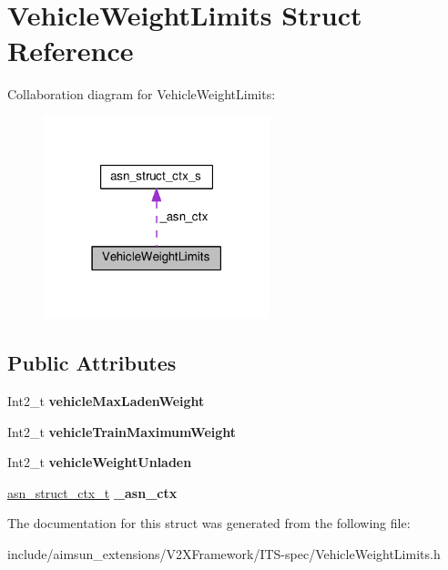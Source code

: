 \hypertarget{structVehicleWeightLimits}{}\section{Vehicle\+Weight\+Limits Struct Reference}
\label{structVehicleWeightLimits}


Collaboration diagram for Vehicle\+Weight\+Limits\+:\nopagebreak
\begin{figure}[H]
\begin{center}
\leavevmode
\includegraphics[width=186pt]{structVehicleWeightLimits__coll__graph}
\end{center}
\end{figure}
\subsection*{Public Attributes}
\begin{DoxyCompactItemize}
\item 
Int2\+\_\+t {\bfseries vehicle\+Max\+Laden\+Weight}\hypertarget{structVehicleWeightLimits_ac32d9e25c41ef6546b2a548384ee5153}{}\label{structVehicleWeightLimits_ac32d9e25c41ef6546b2a548384ee5153}

\item 
Int2\+\_\+t {\bfseries vehicle\+Train\+Maximum\+Weight}\hypertarget{structVehicleWeightLimits_a3f83f448ee86cdf19be08326a472f71c}{}\label{structVehicleWeightLimits_a3f83f448ee86cdf19be08326a472f71c}

\item 
Int2\+\_\+t {\bfseries vehicle\+Weight\+Unladen}\hypertarget{structVehicleWeightLimits_a3649cfe01f681317965b1d7de6223d08}{}\label{structVehicleWeightLimits_a3649cfe01f681317965b1d7de6223d08}

\item 
\hyperlink{structasn__struct__ctx__s}{asn\+\_\+struct\+\_\+ctx\+\_\+t} {\bfseries \+\_\+asn\+\_\+ctx}\hypertarget{structVehicleWeightLimits_a36902d3fac013bc2a742b34bb7047ded}{}\label{structVehicleWeightLimits_a36902d3fac013bc2a742b34bb7047ded}

\end{DoxyCompactItemize}


The documentation for this struct was generated from the following file\+:\begin{DoxyCompactItemize}
\item 
include/aimsun\+\_\+extensions/\+V2\+X\+Framework/\+I\+T\+S-\/spec/Vehicle\+Weight\+Limits.\+h\end{DoxyCompactItemize}
